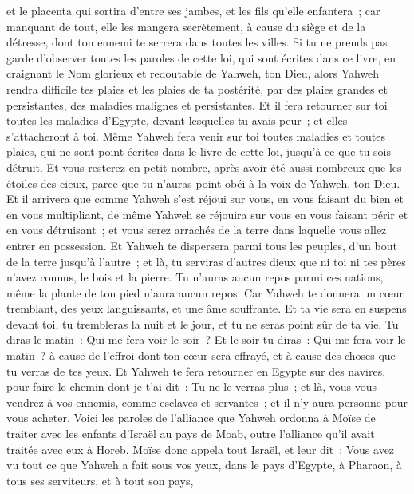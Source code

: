 \begin{multicols}{2}
et le placenta qui sortira d'entre ses jambes, et les fils qu'elle enfantera~; car manquant de tout, elle les mangera secrètement, à cause du siège et de la détresse, dont ton ennemi te serrera dans toutes les villes.
Si tu ne prends pas garde d'observer toutes les paroles de cette loi, qui sont écrites dans ce livre, en craignant le Nom glorieux et redoutable de Yahweh, ton Dieu,
alors Yahweh rendra difficile tes plaies et les plaies de ta postérité, par des plaies grandes et persistantes, des maladies malignes et persistantes.
Et il fera retourner sur toi toutes les maladies d'Egypte, devant lesquelles tu avais peur~; et elles s'attacheront à toi.
Même Yahweh fera venir sur toi toutes maladies et toutes plaies, qui ne sont point écrites dans le livre de cette loi, jusqu'à ce que tu sois détruit.
Et vous resterez en petit nombre, après avoir été aussi nombreux que les étoiles des cieux, parce que tu n'auras point obéi à la voix de Yahweh, ton Dieu.
Et il arrivera que comme Yahweh s'est réjoui sur vous, en vous faisant du bien et en vous multipliant, de même Yahweh se réjouira sur vous en vous faisant périr et en vous détruisant~; et vous serez arrachés de la terre dans laquelle vous allez entrer en possession.
Et Yahweh te dispersera parmi tous les peuples, d'un bout de la terre jusqu'à l'autre~; et là, tu serviras d'autres dieux que ni toi ni tes pères n'avez connus, le bois et la pierre.
Tu n'auras aucun repos parmi ces nations, même la plante de ton pied n'aura aucun repos. Car Yahweh te donnera un cœur tremblant, des yeux languissants, et une âme souffrante.
Et ta vie sera en suspens devant toi, tu trembleras la nuit et le jour, et tu ne seras point sûr de ta vie.
Tu diras le matin~: Qui me fera voir le soir~? Et le soir tu diras~: Qui me fera voir le matin~? à cause de l'effroi dont ton cœur sera effrayé, et à cause des choses que tu verras de tes yeux.
Et Yahweh te fera retourner en Egypte sur des navires, pour faire le chemin dont je t'ai dit~: Tu ne le verras plus~; et là, vous vous vendrez à vos ennemis, comme esclaves et servantes~; et il n'y aura personne pour vous acheter.
\VerseOne{}Voici les paroles de l'alliance que Yahweh ordonna à Moïse de traiter avec les enfants d'Israël au pays de Moab, outre l'alliance qu'il avait traitée avec eux à Horeb.
Moïse donc appela tout Israël, et leur dit~: Vous avez vu tout ce que Yahweh a fait sous vos yeux, dans le pays d'Egypte, à Pharaon, à tous ses serviteurs, et à tout son pays,

\end{multicols}
